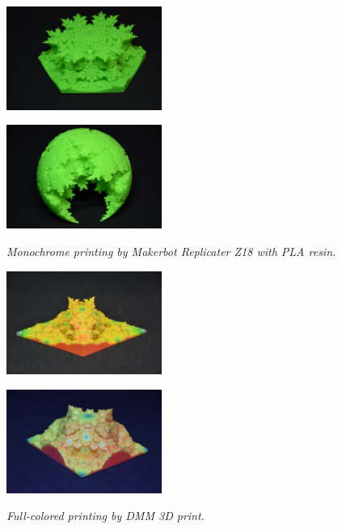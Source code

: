 \begin{figure}[h!tbp]
  \begin{minipage}[t]{0.5\textwidth}
   \centering
   \includegraphics[width=2in, keepaspectratio]{./img/application/sphairahedron/3dprint/mono1.jpg}
   \subcaption{}
   \label{fig:}
  \end{minipage}
 \hspace*{\fill}
  \begin{minipage}[t]{0.5\textwidth}
   \centering
   \includegraphics[width=2in, keepaspectratio]{./img/application/sphairahedron/3dprint/mono2.jpg}
   \subcaption{}
   \label{fig:}
  \end{minipage}
  \hspace*{\fill}
  \caption{\textit{Monochrome printing by Makerbot Replicater Z18 with PLA resin.}}
  \label{fig:3dmono}
  \begin{minipage}[t]{0.5\textwidth}
   \centering
   \includegraphics[width=2in, keepaspectratio]{./img/application/sphairahedron/3dprint/col1.jpg}
   \label{fig:3dcolPlaster}
  \end{minipage}
  \hspace*{\fill}
  \begin{minipage}[t]{0.5\textwidth}
   \centering
   \includegraphics[width=2in, keepaspectratio]{./img/application/sphairahedron/3dprint/col2.jpg}
   \label{fig:3dcolPlastic}
  \end{minipage}
  \hspace*{\fill}
  \caption{\textit{Full-colored printing by DMM 3D print.}}
  \label{fig:}
\end{figure}

